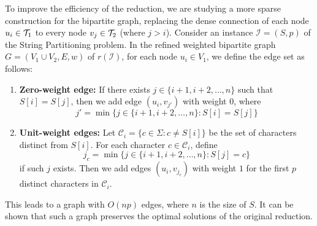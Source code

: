 To improve the efficiency of the reduction, we are studying a more sparse construction for the bipartite graph, replacing the dense connection of each node $u_i \in \mathcal{T}_{1}$ to every node $v_j \in \mathcal{T}_{2}$ (where $j>i$). Consider an instance $\mathcal{I}=(S,p)$ of the String Partitioning problem. In the refined weighted bipartite graph $G = (V_1 \cup V_2, E, w)$ of $r(\mathcal{I})$, for each node $u_i \in V_1$, we define the edge set as follows:
\begin{enumerate}
    \item \textbf{Zero-weight edge:} If there exists $j \in \{i+1, i+2, \ldots, n\}$ such that $S[i] = S[j]$, then we add edge $(u_i, v_{j'})$ with weight $0$, where
    $$j' = \min\{j \in \{i+1, i+2, \ldots, n\} : S[i] = S[j]\}$$
    
    \item \textbf{Unit-weight edges:} Let $\mathcal{C}_i = \{c \in \Sigma : c \neq S[i]\}$ be the set of characters distinct from $S[i]$. For each character $c \in \mathcal{C}_i$, define
    $$j_c = \min\{j \in \{i+1, i+2, \ldots, n\} : S[j] = c\}$$
    if such $j$ exists. Then we add edges $(u_i, v_{j_c})$ with weight $1$ for the first $p$ distinct characters in $\mathcal{C}_i$.
\end{enumerate}
This leads to a graph with $O(np)$ edges, where $n$ is the size of $S$. It can be shown that such a graph preserves the optimal solutions of the original reduction. 

